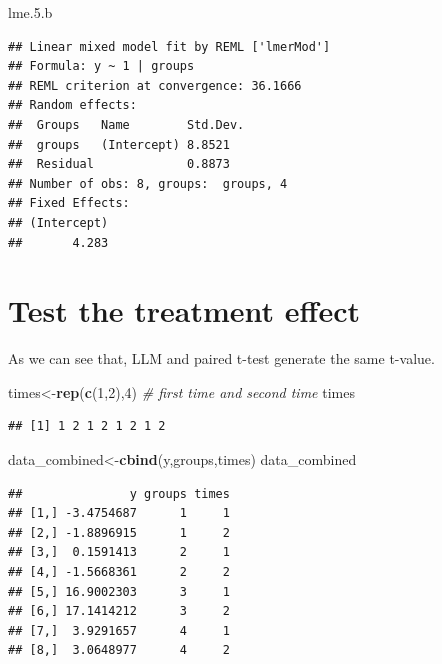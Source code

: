 \documentclass[]{book}
\newenvironment{Shaded}{\begin{snugshade}}{\end{snugshade}}
\newcommand{\KeywordTok}[1]{\textcolor[rgb]{0.13,0.29,0.53}{\textbf{#1}}}
\newcommand{\DecValTok}[1]{\textcolor[rgb]{0.00,0.00,0.81}{#1}}
\newcommand{\FloatTok}[1]{\textcolor[rgb]{0.00,0.00,0.81}{#1}}
\newcommand{\CommentTok}[1]{\textcolor[rgb]{0.56,0.35,0.01}{\textit{#1}}}
\newcommand{\NormalTok}[1]{#1}
\begin{document}
\begin{Shaded}
\begin{Highlighting}[]
\NormalTok{lme.}\FloatTok{5.}\NormalTok{b }
\end{Highlighting}
\end{Shaded}

\begin{verbatim}
## Linear mixed model fit by REML ['lmerMod']
## Formula: y ~ 1 | groups
## REML criterion at convergence: 36.1666
## Random effects:
##  Groups   Name        Std.Dev.
##  groups   (Intercept) 8.8521  
##  Residual             0.8873  
## Number of obs: 8, groups:  groups, 4
## Fixed Effects:
## (Intercept)  
##       4.283
\end{verbatim}

\section{Test the treatment effect}\label{test-the-treatment-effect}

As we can see that, LLM and paired t-test generate the same t-value.

\begin{Shaded}
\begin{Highlighting}[]
\NormalTok{times<-}\KeywordTok{rep}\NormalTok{(}\KeywordTok{c}\NormalTok{(}\DecValTok{1}\NormalTok{,}\DecValTok{2}\NormalTok{),}\DecValTok{4}\NormalTok{) }\CommentTok{# first time and second time}
\NormalTok{times}
\end{Highlighting}
\end{Shaded}

\begin{verbatim}
## [1] 1 2 1 2 1 2 1 2
\end{verbatim}

\begin{Shaded}
\begin{Highlighting}[]
\NormalTok{data_combined<-}\KeywordTok{cbind}\NormalTok{(y,groups,times)}
\NormalTok{data_combined}
\end{Highlighting}
\end{Shaded}

\begin{verbatim}
##               y groups times
## [1,] -3.4754687      1     1
## [2,] -1.8896915      1     2
## [3,]  0.1591413      2     1
## [4,] -1.5668361      2     2
## [5,] 16.9002303      3     1
## [6,] 17.1414212      3     2
## [7,]  3.9291657      4     1
## [8,]  3.0648977      4     2
\end{verbatim}
\end{document}
